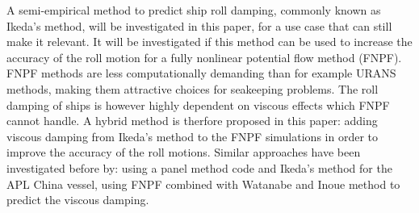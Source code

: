 A semi-empirical method to predict ship roll damping, commonly known as Ikeda's method, will be investigated in this paper, for a use case that can still make it relevant. It will be investigated if this method can be used to increase the accuracy of the roll motion for a fully nonlinear potential flow method (FNPF). FNPF methods are less computationally demanding than for example URANS methods, making them attractive choices for seakeeping problems. The roll damping of ships is however highly dependent on viscous effects which FNPF cannot handle. A hybrid method is therfore proposed in this paper: adding viscous damping from Ikeda's method to the FNPF simulations in order to improve the accuracy of the roll motions. Similar approaches have been investigated before by: \cite{7505983/UGK6YEVD} using a panel method code and Ikeda's method for the APL China vessel, \cite{7505983/24TNAV5Z} using FNPF combined with Watanabe and Inoue method to predict the viscous damping.

    
